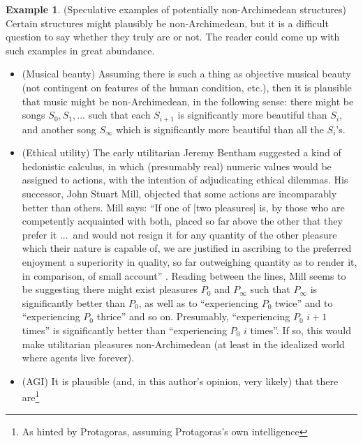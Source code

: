 \documentclass[reqno]{article}
\theoremstyle{definition}
\newtheorem{example}[theorem]{Example}
\begin{document}
\begin{example}
\label{speculativeexamples}
    (Speculative examples of potentially non-Archimedean structures)
    Certain structures might plausibly be non-Archimedean, but it is a difficult
    question to say whether they truly are or not. The reader could come up with
    such examples in great abundance.
    \begin{itemize}
        \item
        (Musical beauty)
        Assuming there is such a thing as objective
        musical beauty (not contingent on features of the human condition, etc.),
        then it is plausible that music might be non-Archimedean, in the following
        sense: there might be songs $S_0,S_1,\ldots$ such that each $S_{i+1}$
        is significantly more beautiful than $S_i$, and another song
        $S_\infty$ which is significantly more beautiful than all the $S_i$'s.
        \item
        (Ethical utility)
        The early utilitarian Jeremy Bentham suggested a kind of hedonistic
        calculus, in which (presumably real) numeric values would be assigned to
        actions, with the intention of adjudicating ethical dilemmas.
        His successor, John Stuart Mill, objected that some actions are incomparably
        better than others. Mill says: ``If one of [two pleasures] is, by those
        who are competently acquainted with both, placed so far above the other that
        they prefer it ...\ and would not resign it for any quantity of the other
        pleasure which their nature is capable of, we are justified in ascribing to
        the preferred enjoyment a superiority in quality, so far outweighing quantity
        as to render it, in comparison, of small account'' \cite{mill}. Reading between
        the lines, Mill seems to be suggesting there might exist pleasures
        $P_0$ and $P_\infty$
        such that $P_\infty$ is significantly better than $P_0$, as well as
        to ``experiencing $P_0$
        twice'' and to ``experiencing $P_0$ thrice'' and so on. Presumably,
        ``experiencing $P_0$ $i+1$ times'' is significantly better than
        ``experiencing $P_0$ $i$ times''. If so, this would make
        utilitarian pleasures non-Archimedean (at least in the idealized world
        where agents live forever).
        \item
        (AGI)
        It is plausible (and, in this author's opinion, very likely) that there
        are\footnote{As hinted by Protagoras, assuming Protagoras's own intelligence
}
\end{itemize}
\end{example}
\end{document}
